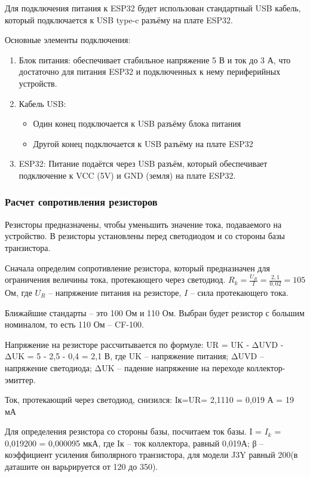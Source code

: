 \documentclass{bmstu}
\begin{document}
    Для подключения питания к ESP32 будет использован стандартный USB кабель,
    который подключается к USB type-c разъёму на плате ESP32.

    Основные элементы подключения:
    \begin{enumerate}
        \item Блок питания: обеспечивает стабильное напряжение 5 В и ток до 3 А, что достаточно для питания ESP32 и
        подключенных к нему периферийных устройств.
        \item Кабель USB:
        \begin{itemize}
            \item Один конец подключается к USB разъёму блока питания
            \item Другой конец подключается к USB разъёму на плате ESP32
        \end{itemize}
        \item ESP32: Питание подаётся через USB разъём, который обеспечивает подключение к VCC (5V) и GND (земля) на плате ESP32.
    \end{enumerate}

    \subsubsection{Расчет сопротивления резисторов}\label{subsubsec:resistence}

    Резисторы предназначены, чтобы уменьшить значение тока, подаваемого на устройство.
    В резисторы установлены перед светодиодом и со стороны базы транзистора.

	Сначала определим сопротивление резистора, который предназначен для ограничения величины тока, протекающего через светодиод.
    $R_{k} = \frac{U_R}{I}  = \frac{2,1}{0,02} = 105$ Ом, где $U_R$ – напряжение питания на резисторе, $I$ – сила протекающего тока.

    Ближайшие стандарты – это 100 Ом и 110 Ом.
    Выбран будет резистор с большим номиналом, то есть 110 Ом – CF-100.

	Напряжение на резисторе рассчитывается по формуле:
        UR = UK - ΔUVD - ΔUK = 5 - 2,5 - 0,4 = 2,1 В, где UK – напряжение питания;
    ΔUVD – напряжение светодиода;
	ΔUK – падение напряжение на переходе коллектор-эмиттер.

	Ток, протекающий через светодиод, снизился: Iк=UR= 2,1110 = 0,019 А = 19 мА

	Для определения резистора со стороны базы, посчитаем ток базы.
    I = $I_{k}$ = 0,019200 = 0,000095 мкА, где Iк – ток коллектора, равный 0,019А;
	β – коэффициент усиления биполярного транзистора, для модели J3Y равный 200(в даташите он варьрируется от 120 до 350).
\end{document}
